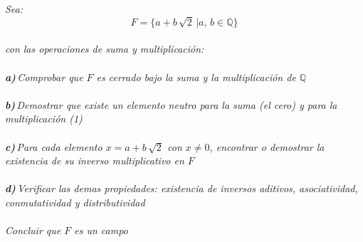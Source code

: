\documentclass[11pt,letterpaper]{article}
\begin{document}
\begin{tcolorbox}[
	title = \textcolor{black}{\textcolor{white}{Problema 3}},]
\textit{Sea:\,\\
\begin{equation*}
    F=\{a+b\,\sqrt{2}\,|a,\,b\in \mathbb{Q}\}
\end{equation*}\,\\
con las operaciones de suma y multiplicaci\'on:\,\\
\,\\
\textbf{a)}\,Comprobar que $F$ es cerrado bajo la suma y la multiplicaci\'on de $\mathbb{Q}$\,\\
\,\\
\textbf{b)}\,Demostrar que existe un elemento neutro para la suma (el cero) y para la multiplicaci\'on (1)\,\\
\,\\
\textbf{c)}\,Para cada elemento $x=a+b\,\sqrt{2}$ con $x\neq 0$, encontrar o demostrar la existencia de su inverso multiplicativo
en $F$\,\\
\,\\
\textbf{d)}\,Verificar las demas propiedades: existencia de inversos aditivos, asociatividad, conmutatividad y distributividad\,\\
\,\\
Concluir que $F$ es un campo
}
\end{tcolorbox}\,\\
\end{document}
